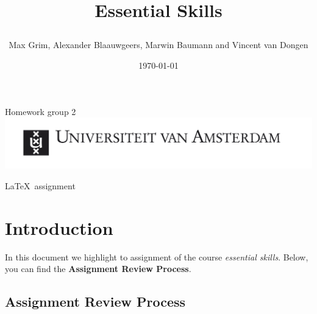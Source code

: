 \documentclass[11pt]{article}
\begin{document}
\title{\begin{Huge} Essential Skills \end{Huge}}
  \author{\begin{Large} Max Grim, Alexander Blaauwgeers, Marwin Baumann and Vincent van Dongen \end{Large}}
    \date{\today}
\maketitle

\begin{center}
  Homework group 2\\[1in]
  \includegraphics[scale=1.5]{uva.png}
  {\begin{huge} \LaTeX \ assignment \end{huge}}
\end{center}

\newpage
\tableofcontents

\newpage
\section{Introduction}
In this document we highlight to assignment of the course \textit{essential skills}. Below, you can find the \textbf{Assignment Review Process}.

\subsection{Assignment Review Process}
\end{document}
